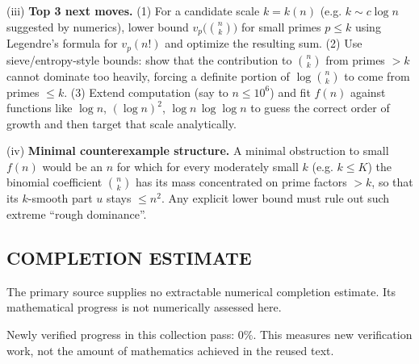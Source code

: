(iii) \textbf{Top 3 next moves.}
(1) For a candidate scale $k=k(n)$ (e.g. $k\sim c\log n$ suggested by numerics), lower bound $v_p\bigl(\binom{n}{k}\bigr)$ for small primes $p\le k$ using Legendre's formula for $v_p(n!)$ and optimize the resulting sum.
(2) Use sieve/entropy-style bounds: show that the contribution to $\binom{n}{k}$ from primes $>k$ cannot dominate too heavily, forcing a definite portion of $\log\binom{n}{k}$ to come from primes $\le k$.
(3) Extend computation (say to $n\le 10^{6}$) and fit $f(n)$ against functions like $\log n$, $(\log n)^2$, $\log n\,\log\log n$ to guess the correct order of growth and then target that scale analytically.

(iv) \textbf{Minimal counterexample structure.}
A minimal obstruction to small $f(n)$ would be an $n$ for which for every moderately small $k$ (e.g. $k\le K$) the binomial coefficient $\binom{n}{k}$ has its mass concentrated on prime factors $>k$, so that its $k$-smooth part $u$ stays $\le n^{2}$. Any explicit lower bound must rule out such extreme ``rough dominance''.


\subsection*{COMPLETION ESTIMATE}
The primary source supplies no extractable numerical completion estimate. Its mathematical progress is not numerically assessed here.

Newly verified progress in this collection pass: $0\%$. This measures new verification work, not the amount of mathematics achieved in the reused text.
